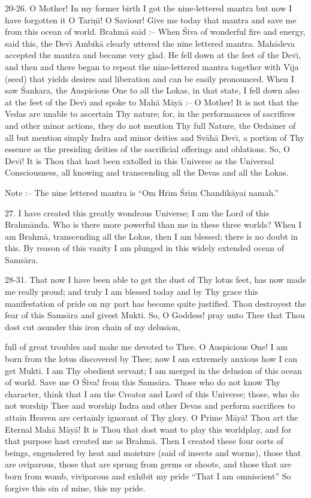 20-26. O Mother! In my former birth I got the nine-lettered mantra but now I have forgotten it O Tari\d{n}\={\i}! O Saviour! Give me today that mantra and save me from this ocean of world. Brahm\=a said :-- When \'Siva of wonderful fire and energy, said this, the Dev\={\i} Ambik\=a clearly uttered the nine lettered mantra. Mah\=adeva accepted the mantra and became very glad. He fell down at the feet of the Dev\={\i}, and then and there began to repeat the nine-lettered mantra together with V\={\i}ja (seed) that yields desires and liberation and can be easily pronounced. When I saw \'Sankara, the Auspicious One to all the Lokas, in that state, I fell down also at the feet of the Dev\={\i} and spoke to Mah\=a M\=ay\=a :-- O Mother! It is not that the Vedas are unable to ascertain Thy nature; for, in the performances of sacrifices and other minor actions, they do not mention Thy full Nature, the Ordainer of all but mention simply Indra and minor deities and Sv\=ah\=a Dev\={\i}, a portion of Thy essence as the presiding deities of the sacrificial offerings and oblations. So, O Dev\={\i}! It is Thou that hast been extolled in this Universe as the Universal Consciousness, all knowing and transcending all the Devas and all the Lokas.

Note :-- The nine lettered mantra is ``Om Hr\={\i}m \'Sr\={\i}m Chandik\=ayai namah.''

27. I have created this greatly wondrous Universe; I am the Lord of this Brahm\=anda. Who is there more powerful than me in these three worlds? When I am Brahm\=a, transcending all the Lokas, then I am blessed; there is no doubt in this. By reason of this vanity I am plunged in this widely extended ocean of Sams\=ara.

28-31. That now I have been able to get the dust of Thy lotus feet, has now made me really proud; and truly I am blessed today and by Thy grace this manifestation of pride on my part has become quite justified. Thou destroyest the fear of this Sams\=ara and givest Mukti. So, O Goddess! pray unto Thee that Thou dost cut asunder this iron chain of my delusion,

full of great troubles and make me devoted to Thee. O Auspicious One! I am born from the lotus discovered by Thee; now I am extremely anxious how I can get Mukti. I am Thy obedient servant; I am merged in the delusion of this ocean of world. Save me O \'Siva! from this Sams\=ara. Those who do not know Thy character, think that I am the Creator and Lord of this Universe; those, who do not worship Thee and worship Indra and other Devas and perform sacrifices to attain Heaven are certainly ignorant of Thy glory. O Prime M\=ay\=a! Thou art the Eternal Mah\=a M\=ay\=a! It is Thou that dost want to play this worldplay, and for that purpose hast created me as Brahm\=a. Then I created these four sorts of beings, engendered by heat and moisture (said of insects and worms), those that are oviparous, those that are sprung from germs or shoots, and those that are born from womb, viviparous and exhibit my pride ``That I am omniscient'' So forgive this sin of mine, this my pride.

